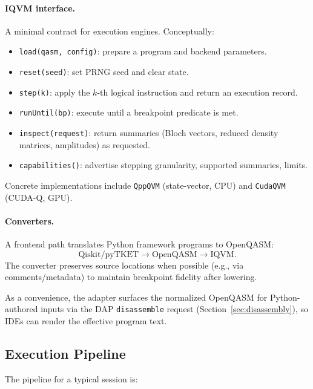 \documentclass[12pt]{article}
\begin{document}
\paragraph{IQVM interface.}
A minimal contract for execution engines. Conceptually:

\begin{itemize}
  \item \texttt{load(qasm, config)}: prepare a program and backend parameters.
  \item \texttt{reset(seed)}: set PRNG seed and clear state.
  \item \texttt{step(k)}: apply the \(k\)-th logical instruction and return an execution record.
  \item \texttt{runUntil(bp)}: execute until a breakpoint predicate is met.
  \item \texttt{inspect(request)}: return summaries (Bloch vectors, reduced density matrices, amplitudes) as requested.
  \item \texttt{capabilities()}: advertise stepping granularity, supported summaries, limits.
\end{itemize}

Concrete implementations include \texttt{QppQVM} (state-vector, CPU) and \texttt{CudaQVM} (CUDA-Q, GPU).

\paragraph{Converters.}
A frontend path translates Python framework programs to OpenQASM:
\[
\text{Qiskit/pyTKET} \longrightarrow \text{OpenQASM} \longrightarrow \text{IQVM}.
\]
The converter preserves source locations when possible (e.g., via comments/metadata) to maintain breakpoint fidelity after lowering.

As a convenience, the adapter surfaces the normalized OpenQASM for Python-authored inputs via the DAP \texttt{disassemble} request (Section~\ref{sec:disassembly}), so IDEs can render the effective program text.

\subsection{Execution Pipeline}

The pipeline for a typical session is:
\end{document}
